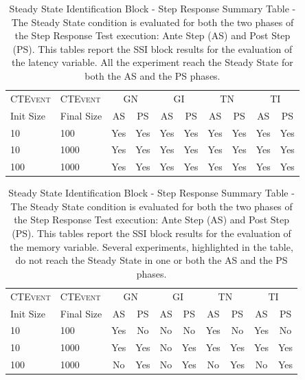 \begin{table}[h]
\centering
\scriptsize
\begin{tabular}{ll|c|c|c|c|c|c|c|c}
\hline
\textsc{CTEvent}&\textsc{CTEvent}&\multicolumn{2}{c|}{GN}& \multicolumn{2}{c|}{GI}& \multicolumn{2}{c|}{TN}& \multicolumn{2}{c}{TI} \\
 Init Size & Final Size & AS& PS& AS& PS& AS& PS& AS & PS\\ 
\hline
\hline
10 & 100 & Yes& Yes & Yes & Yes & Yes& Yes & Yes & Yes \\ 
10 & 1000& Yes& Yes& Yes & Yes& Yes& Yes& Yes& Yes\\ 
100& 1000& Yes & Yes& Yes & Yes& Yes & Yes& Yes  & Yes\\ 
\hline
\end{tabular}
\caption[Steady State Identification Block - Step Response Summary Table - Latency]{Steady State Identification Block - Step Response Summary Table - The Steady State condition is evaluated for both the two phases of the Step Response Test execution: Ante Step (AS) and Post Step (PS). This tables report the SSI block results for the evaluation of the latency variable. All the experiment reach the Steady State for both the AS and the PS phases.}
\label{tab:ss-step-latency}
\end{table}


\begin{table}[h]
\centering
\scriptsize
\begin{tabular}{ll|c|c|c|c|c|c|c|c}
\hline
\textsc{CTEvent}&\textsc{CTEvent}&\multicolumn{2}{c|}{GN}& \multicolumn{2}{c|}{GI}& \multicolumn{2}{c|}{TN}& \multicolumn{2}{c}{TI} \\
 Init Size & Final Size & AS& PS& AS& PS& AS& PS& AS & PS\\ 
\hline
\hline
10 & 100 & Yes& \cellcolor[HTML]{C0C0C0}No & \cellcolor[HTML]{C0C0C0}No & \cellcolor[HTML]{C0C0C0}No & Yes& \cellcolor[HTML]{C0C0C0}No & \cellcolor[HTML]{FFFFFF}Yes & \cellcolor[HTML]{C0C0C0}No \\ 
10 & 1000& Yes& Yes& \cellcolor[HTML]{C0C0C0}No & Yes& Yes& Yes& Yes& Yes\\ 
100& 1000& \cellcolor[HTML]{C0C0C0}No & Yes& \cellcolor[HTML]{C0C0C0}No & Yes& \cellcolor[HTML]{C0C0C0}No & Yes& \cellcolor[HTML]{C0C0C0}No  & Yes\\ 
\hline
\end{tabular}
\caption[Steady State Identification Block - Step Response Summary Table - Memory]{Steady State Identification Block - Step Response Summary Table - The Steady State condition is evaluated for both the two phases of the Step Response Test execution: Ante Step (AS) and Post Step (PS). This tables report the SSI block results for the evaluation of the memory variable. Several experiments, highlighted in the table, do not reach the Steady State in one or both the AS and the PS phases.}
\label{tab:ss-step-memory}
\end{table}

